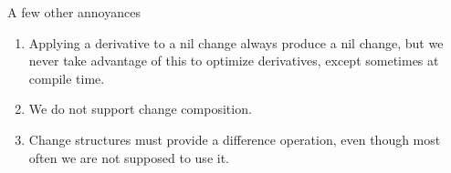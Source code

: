 \documentclass{book}
\begin{document}
A few other annoyances
\begin{enumerate}
\item Applying a derivative to a nil change always produce a nil change, but we
  never take advantage of this to optimize derivatives, except sometimes at
  compile time.
\item We do not support change composition.
\item Change structures must provide a difference operation, even though most
  often we are not supposed to use it.
\end{enumerate}


\end{document}
